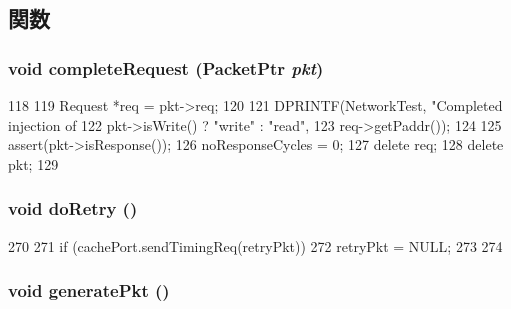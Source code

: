 \subsection{関数}
\hypertarget{classNetworkTest_afad8eceee562939262183ad20f806b82}{
\subsubsection[{completeRequest}]{\setlength{\rightskip}{0pt plus 5cm}void completeRequest ({\bf PacketPtr} {\em pkt})}}
\label{classNetworkTest_afad8eceee562939262183ad20f806b82}



\begin{DoxyCode}
118 {
119     Request *req = pkt->req;
120 
121     DPRINTF(NetworkTest, "Completed injection of %
122             pkt->isWrite() ? "write" : "read\n",
123             req->getPaddr());
124 
125     assert(pkt->isResponse());
126     noResponseCycles = 0;
127     delete req;
128     delete pkt;
129 }
\end{DoxyCode}
\hypertarget{classNetworkTest_a31440e5510a8c7bfc74e17363d813401}{
\subsubsection[{doRetry}]{\setlength{\rightskip}{0pt plus 5cm}void doRetry ()}}
\label{classNetworkTest_a31440e5510a8c7bfc74e17363d813401}



\begin{DoxyCode}
270 {
271     if (cachePort.sendTimingReq(retryPkt)) {
272         retryPkt = NULL;
273     }
274 }
\end{DoxyCode}
\hypertarget{classNetworkTest_af3b3ac4f2b4a4cf1ee74748126a70641}{
\subsubsection[{generatePkt}]{\setlength{\rightskip}{0pt plus 5cm}void generatePkt ()}}
\label{classNetworkTest_af3b3ac4f2b4a4cf1ee74748126a70641}



